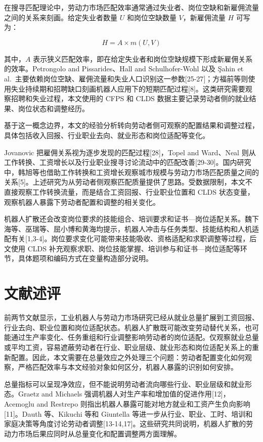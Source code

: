 \documentclass[UTF8, zihao=-4, a4paper, openany, fontset=none]{ctexrep}
\numberwithin{equation}{chapter}
\begin{document}
在搜寻匹配理论中，劳动力市场匹配效率通常通过失业者、岗位空缺和新雇佣流量之间的关系来刻画。给定失业者数量 \(U\) 和岗位空缺数量 \(V\)，新雇佣流量 \(H\) 可写为：

\[
H=A \times m(U,V)
\]

其中，\(A\) 表示狭义匹配效率，即在给定失业者和岗位空缺规模下形成新雇佣关系的效率。Petrongolo and Pissarides、Hall and Schulhofer-Wohl 以及 Şahin et al.~主要依赖岗位空缺、雇佣流量和失业人口识别这一参数{[}25-27{]}；方福前等则使用失业持续期和招聘缺口刻画机器人应用下的短期匹配过程{[}8{]}。这类研究需要观察招聘和失业过程，本文使用的 CFPS 和 CLDS 数据主要记录劳动者侧的就业结果、岗位状态和调整经历。

基于这一概念边界，本文的经验分析转向劳动者侧可观察的配置结果和调整过程，具体包括收入回报、行业职业去向、就业形态和岗位适配等变化。

Jovanovic 把雇佣关系视为逐步发现的匹配过程{[}28{]}，Topel and Ward、Neal 则从工作转换、工资增长以及行业职业搜寻讨论流动中的匹配改善{[}29-30{]}。国内研究中，韩旭等也借助工作转换和工资增长观察城市规模与劳动力市场匹配质量之间的关系{[}5{]}。上述研究为从劳动者侧观察匹配质量提供了思路。受数据限制，本文不直接观察工作转换流量，而是结合工资回报、行业职业位置和 CLDS 状态变量，观察机器人暴露下劳动者配置和调整的相关变化。

机器人扩散还会改变岗位要求的技能组合、培训要求和证书---岗位适配关系。魏下海等、巫瑞等、屈小博和黄海均提示，机器人冲击与任务类型、技能结构和人机适配有关{[}1,3-4{]}。岗位要求变化可能带来技能吸收、资格适配和求职调整等过程，后文使用 CLDS 补充观察求职、岗位技能掌握、培训参与和证书---岗位适配等环节，具体题项和编码方式在变量构造部分说明。

\section{文献述评}\label{ux6587ux732eux8ff0ux8bc4}

前两节文献显示，工业机器人与劳动力市场研究已经从就业总量扩展到工资回报、行业去向、职业位置和岗位适配状态。机器人扩散既可能改变劳动替代关系，也可能通过生产率变化、任务重组和行业调整影响劳动者的岗位适配。仅观察就业总量或平均工资，容易遮蔽劳动者在行业、职业层级、就业形态和岗位适配关系上的重新配置。因此，本文需要在总量效应之外处理三个问题：劳动者配置变化如何观察，严格匹配效率与本文经验对象如何区分，机器人暴露的识别如何安排。

总量指标可以呈现净效应，但不能说明劳动者流向哪些行业、职业层级和就业形态。Graetz and Michaels 强调机器人对生产率和增加值的促进作用{[}12{]}，Acemoglu and Restrepo 则指出机器人暴露可能对地方就业和工资产生负向影响{[}11{]}。Dauth 等、Kikuchi 等和 Giuntella 等进一步从行业、职业、工时、培训和家庭决策等角度讨论劳动者调整{[}13-14,17{]}。这些研究共同说明，机器人扩散的劳动力市场后果应同时从总量变化和配置调整两方面理解。
\end{document}
